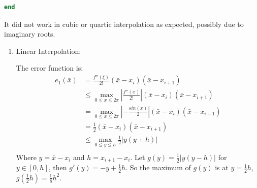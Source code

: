 \documentclass[conference,onecolumn]{IEEEtran}
\begin{document}
\begin{enumerate}[label=\arabic{enumi}.]
\begin{lstlisting}[language=MATLAB]
end
          \end{lstlisting}
          It did not work in cubic or quartic interpolation as expected, possibly due to imaginary roots.
          \begin{enumerate}
              \item Linear Interpolation:

                    The error function is:
                    \begin{align*}
                        e_1(\bar{x}) & = \frac{f''(\xi)}{2!}(\bar{x} - x_{i})(\bar{x} - x_{i+1})                                \\
                                     & \leq \max_{0 \leq x \leq 2 \pi} |\frac{f''(x)}{2!}| (\bar{x} - x_{i})(\bar{x} - x_{i+1}) \\
                                     & = \max_{0 \leq x \leq 2 \pi} |-\frac{sin(x)}{2}| (\bar{x} - x_{i})(\bar{x} - x_{i+1})    \\
                                     & = \frac{1}{2} (\bar{x} - x_{i})(\bar{x} - x_{i+1})                                       \\
                                     & \leq \max_{0 \leq y \leq h} \frac{1}{2} |y(y + h)|                                       \\
                    \end{align*}
                    Where $y = \bar{x} - x_{i}$ and $h = x_{i+1} - x_i$.
                    Let $g(y) = \frac{1}{2} |y(y - h)|$ for $y \in [0, h]$, then $g'(y) = - y + \frac{1}{2}h$.
                    So the maximum of $g(y)$ is at $y = \frac{1}{2}h$, $g(\frac{1}{2}h) = \frac{1}{8}h^2$.


\end{enumerate}
\end{enumerate}
\end{document}
